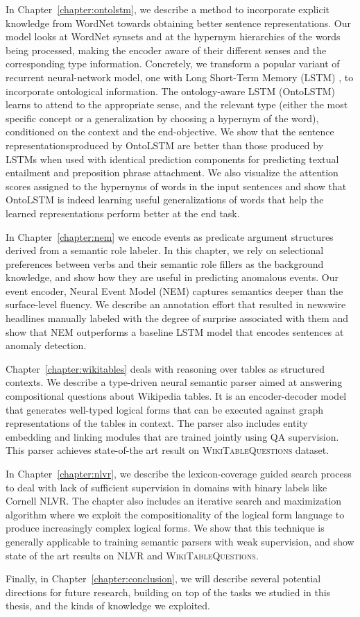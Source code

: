 In Chapter~\ref{chapter:ontolstm}, we describe a method to incorporate explicit knowledge
from WordNet towards obtaining better sentence representations. Our model looks at WordNet synsets
and at the hypernym hierarchies of the words being processed, making the 
encoder aware of their different senses and the corresponding type information. Concretely, we transform a
popular variant of recurrent neural-network model, one with Long Short-Term Memory (LSTM) \citep{hochreiter1997long}, to incorporate ontological information.
The ontology-aware LSTM (OntoLSTM) learns to attend to the appropriate sense,
and the relevant type 
(either the most specific concept or a generalization by choosing a hypernym of
the word), conditioned on the context and the end-objective. We show that the sentence representationsproduced by OntoLSTM are better than those produced by LSTMs when used with identical prediction 
components for predicting textual entailment and preposition phrase attachment. We also visualize the attention scores assigned to the hypernyms 
of words in the input sentences and show that OntoLSTM is indeed learning useful generalizations of words
that help the learned representations perform better at the end task.

In Chapter~\ref{chapter:nem} we encode events as predicate argument structures derived from a semantic role labeler.
In this chapter, we rely on selectional preferences between verbs and their semantic role fillers as the background
knowledge, and show how they are useful in predicting anomalous events.
Our event encoder, Neural Event Model (NEM) captures semantics deeper than the surface-level fluency. We describe an annotation effort that
resulted in newswire headlines manually labeled with the degree of surprise associated with them and show that NEM outperforms
a baseline LSTM model that encodes sentences at anomaly detection. 

Chapter~\ref{chapter:wikitables} deals with reasoning over tables as structured contexts. We describe a type-driven
neural semantic parser aimed at answering compositional questions about Wikipedia tables. It is an encoder-decoder model that generates
well-typed logical forms that can be executed against graph representations of the tables in context. The parser also includes entity embedding
and linking modules that are trained jointly using QA supervision. This parser achieves state-of-the art result on \textsc{WikiTableQuestions} dataset.

In Chapter~\ref{chapter:nlvr}, we describe the lexicon-coverage guided search process to deal with lack of sufficient supervision in domains with binary labels like Cornell NLVR\@.
The chapter also includes an iterative search and maximization
algorithm where we exploit the compositionality of the logical form language to produce increasingly complex logical forms. We show that this
technique is generally applicable to training semantic parsers with weak supervision, and show state of the art results on NLVR and \textsc{WikiTableQuestions}.

Finally, in Chapter~\ref{chapter:conclusion}, we will describe several potential directions for future research, building on top of the tasks we studied in this thesis, and
the kinds of knowledge we exploited.
